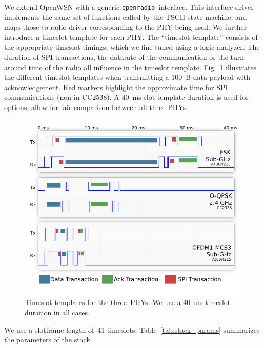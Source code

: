 \documentclass[sensors,article,submit,moreauthors,pdftex]{Definitions/mdpi}
\newcommand{\openradio}     {\texttt{openradio}}
\newcommand{\figwidth}      {0.80}
\begin{document}

We extend OpenWSN with a generic \openradio\ interface.
This interface driver implements the same set of functions called by the TSCH state machine, and maps those to radio driver corresponding to the PHY being used.
We further introduce a timeslot template for each PHY.
The ``timeslot template'' consists of the appropriate timeslot timings, which we fine tuned using a logic analyzer.
The duration of SPI transactions, the datarate of the communication or the turn-around time of the radio all influence in the timeslot template.
Fig.~\ref{fig:timeslot_templates} illustrates the different timeslot templates when transmitting a 100~B data payload with acknowledgement.
Red markers highlight the approximate time for SPI communications (non in CC2538).
A 40~ms slot template duration is used for options, allow for fair comparison between all three PHYs.

\begin{figure}
	\centering
	\includegraphics[width=\figwidth\columnwidth]{timeslot_templates}
	\caption{
	    Timeslot templates for the three~PHYs.
	    We use a 40~ms timeslot duration in all cases.
	}
    \label{fig:timeslot_templates}
\end{figure}


We use a slotframe length of~41 timeslots.
Table~\ref{tab:stack_params} summarizes the parameters of the stack.
\end{document}
